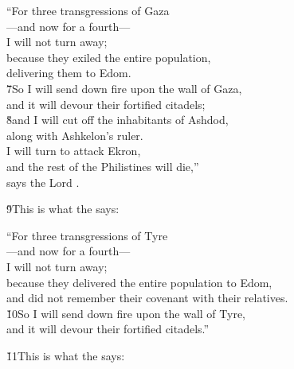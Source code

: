 \begin{poetry}
\poeml ``For three transgressions of Gaza \\
\poemll    ---and now for a fourth--- \\
\poemlll       I will not turn away; \\
\poeml because they exiled the entire population, \\
\poemll    delivering them to Edom. \\
\poeml \v{7}So I will send down fire upon the wall of Gaza, \\
\poemll    and it will devour their fortified citadels; \\
\poeml \v{8}and I will cut off the inhabitants of Ashdod, \\
\poemll    along with Ashkelon's ruler. \\
\poeml I will turn to attack Ekron, \\
\poemll    and the rest of the Philistines will die,'' \\
\poemlll       says the Lord .
\end{poetry}

\v{9}This is what the  says:

\begin{poetry}
\poeml ``For three transgressions of Tyre \\
\poemll    ---and now for a fourth--- \\
\poemlll       I will not turn away; \\
\poeml because they delivered the entire population to Edom, \\
\poemll    and did not remember their covenant with their relatives. \\
\poeml \v{10}So I will send down fire upon the wall of Tyre, \\
\poemll    and it will devour their fortified citadels.''
\end{poetry}

\v{11}This is what the  says:

